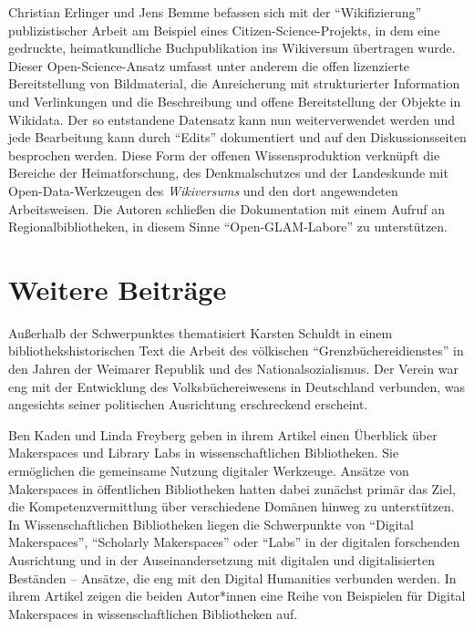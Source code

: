 \documentclass[a4paper,
fontsize=11pt,
oneside,
numbers=noperiodatend,
parskip=half-,
bibliography=totoc,
final
]{scrartcl}
\begin{document}
Christian Erlinger und Jens Bemme befassen sich mit der
\enquote{Wikifizierung} publizistischer Arbeit am Beispiel eines
Citizen-Science-Projekts, in dem eine gedruckte, heimatkundliche
Buchpublikation ins Wikiversum übertragen wurde. Dieser
Open-Science-Ansatz umfasst unter anderem die offen lizenzierte
Bereitstellung von Bildmaterial, die Anreicherung mit strukturierter
Information und Verlinkungen und die Beschreibung und offene
Bereitstellung der Objekte in Wikidata. Der so entstandene Datensatz
kann nun weiterverwendet werden und jede Bearbeitung kann durch
\enquote{Edits} dokumentiert und auf den Diskussionsseiten besprochen
werden. Diese Form der offenen Wissensproduktion verknüpft die Bereiche
der Heimatforschung, des Denkmalschutzes und der Landeskunde mit
Open-Data-Werkzeugen des \emph{Wikiversums} und den dort angewendeten
Arbeitsweisen. Die Autoren schließen die Dokumentation mit einem Aufruf
an Regionalbibliotheken, in diesem Sinne \enquote{Open-GLAM-Labore} zu
unterstützen.

\hypertarget{weitere-beitruxe4ge}{%
\section{Weitere Beiträge}\label{weitere-beitruxe4ge}}

Außerhalb der Schwerpunktes thematisiert Karsten Schuldt in einem
bibliothekshistorischen Text die Arbeit des völkischen
\enquote{Grenzbüchereidienstes} in den Jahren der Weimarer Republik und
des Nationalsozialismus. Der Verein war eng mit der Entwicklung des
Volksbüchereiwesens in Deutschland verbunden, was angesichts seiner
politischen Ausrichtung erschreckend erscheint.

Ben Kaden und Linda Freyberg geben in ihrem Artikel einen Überblick über
Makerspaces und Library Labs in wissenschaftlichen Bibliotheken. Sie
ermöglichen die gemeinsame Nutzung digitaler Werkzeuge. Ansätze von
Makerspaces in öffentlichen Bibliotheken hatten dabei zunächst primär
das Ziel, die Kompetenzvermittlung über verschiedene Domänen hinweg zu
unterstützen. In Wissenschaftlichen Bibliotheken liegen die Schwerpunkte
von \enquote{Digital Makerspaces}, \enquote{Scholarly Makerspaces} oder
\enquote{Labs} in der digitalen forschenden Ausrichtung und in der
Auseinandersetzung mit digitalen und digitalisierten Beständen --
Ansätze, die eng mit den Digital Humanities verbunden werden. In ihrem
Artikel zeigen die beiden Autor*innen eine Reihe von Beispielen für
Digital Makerspaces in wissenschaftlichen Bibliotheken auf.
\end{document}

